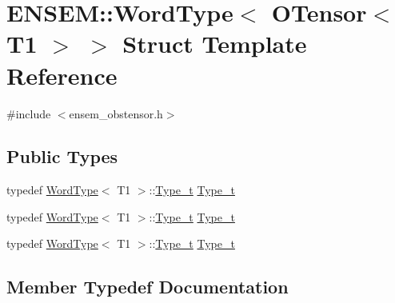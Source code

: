 \hypertarget{structENSEM_1_1WordType_3_01OTensor_3_01T1_01_4_01_4}{}\section{E\+N\+S\+EM\+:\+:Word\+Type$<$ O\+Tensor$<$ T1 $>$ $>$ Struct Template Reference}
\label{structENSEM_1_1WordType_3_01OTensor_3_01T1_01_4_01_4}


{\ttfamily \#include $<$ensem\+\_\+obstensor.\+h$>$}

\subsection*{Public Types}
\begin{DoxyCompactItemize}
\item 
typedef \mbox{\hyperlink{structENSEM_1_1WordType}{Word\+Type}}$<$ T1 $>$\+::\mbox{\hyperlink{structENSEM_1_1WordType_3_01OTensor_3_01T1_01_4_01_4_a7eb2940d941e35ae189a26d059d7668b}{Type\+\_\+t}} \mbox{\hyperlink{structENSEM_1_1WordType_3_01OTensor_3_01T1_01_4_01_4_a7eb2940d941e35ae189a26d059d7668b}{Type\+\_\+t}}
\item 
typedef \mbox{\hyperlink{structENSEM_1_1WordType}{Word\+Type}}$<$ T1 $>$\+::\mbox{\hyperlink{structENSEM_1_1WordType_3_01OTensor_3_01T1_01_4_01_4_a7eb2940d941e35ae189a26d059d7668b}{Type\+\_\+t}} \mbox{\hyperlink{structENSEM_1_1WordType_3_01OTensor_3_01T1_01_4_01_4_a7eb2940d941e35ae189a26d059d7668b}{Type\+\_\+t}}
\item 
typedef \mbox{\hyperlink{structENSEM_1_1WordType}{Word\+Type}}$<$ T1 $>$\+::\mbox{\hyperlink{structENSEM_1_1WordType_3_01OTensor_3_01T1_01_4_01_4_a7eb2940d941e35ae189a26d059d7668b}{Type\+\_\+t}} \mbox{\hyperlink{structENSEM_1_1WordType_3_01OTensor_3_01T1_01_4_01_4_a7eb2940d941e35ae189a26d059d7668b}{Type\+\_\+t}}
\end{DoxyCompactItemize}


\subsection{Member Typedef Documentation}
\mbox{\label{structENSEM_1_1WordType_3_01OTensor_3_01T1_01_4_01_4_a7eb2940d941e35ae189a26d059d7668b}} 
